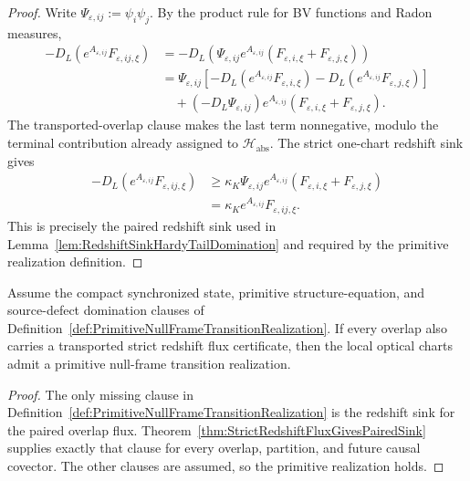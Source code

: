 \begin{proof}
Write $\Psi_{\varepsilon,ij}:=\psi_i\psi_j$.  By the product rule for BV functions and Radon measures,
\[
\begin{split}
    -D_L\!\left(e^{A_{\varepsilon,ij}}F_{\varepsilon,ij,\xi}\right)
    &=
    -D_L\!\left(\Psi_{\varepsilon,ij}e^{A_{\varepsilon,ij}}
    (F_{\varepsilon,i,\xi}+F_{\varepsilon,j,\xi})\right)\\
    &=
    \Psi_{\varepsilon,ij}
    \left[
        -D_L(e^{A_{\varepsilon,ij}}F_{\varepsilon,i,\xi})
        -D_L(e^{A_{\varepsilon,ij}}F_{\varepsilon,j,\xi})
    \right]\\
    &\quad
    +(-D_L\Psi_{\varepsilon,ij})e^{A_{\varepsilon,ij}}
    (F_{\varepsilon,i,\xi}+F_{\varepsilon,j,\xi}).
\end{split}
\]
The transported-overlap clause makes the last term nonnegative, modulo the terminal contribution already assigned to $\mathcal H_{\mathrm{abs}}$.  The strict one-chart redshift sink gives
\[
\begin{split}
    -D_L\!\left(e^{A_{\varepsilon,ij}}F_{\varepsilon,ij,\xi}\right)
    &\ge
    \kappa_K\Psi_{\varepsilon,ij}e^{A_{\varepsilon,ij}}
    (F_{\varepsilon,i,\xi}+F_{\varepsilon,j,\xi})\\
    &=
    \kappa_K e^{A_{\varepsilon,ij}}F_{\varepsilon,ij,\xi}.
\end{split}
\]
This is precisely the paired redshift sink used in Lemma~\ref{lem:RedshiftSinkHardyTailDomination} and required by the primitive realization definition.
\end{proof}

\begin{corollary}\label{cor:StrictRedshiftPrimitiveRealizationCriterion}
Assume the compact synchronized state, primitive structure-equation, and source-defect domination clauses of Definition~\ref{def:PrimitiveNullFrameTransitionRealization}.  If every overlap also carries a transported strict redshift flux certificate, then the local optical charts admit a primitive null-frame transition realization.
\end{corollary}

\begin{proof}
The only missing clause in Definition~\ref{def:PrimitiveNullFrameTransitionRealization} is the redshift sink for the paired overlap flux.  Theorem~\ref{thm:StrictRedshiftFluxGivesPairedSink} supplies exactly that clause for every overlap, partition, and future causal covector.  The other clauses are assumed, so the primitive realization holds.
\end{proof}

